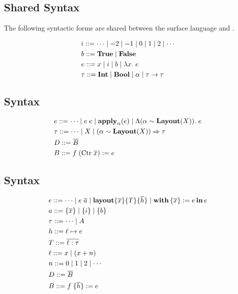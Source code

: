 \subsection{Shared Syntax}

The following syntactic forms are shared between the \Pika{} surface language and \PikaCore.

\begin{align*}
  &i ::= \cdots \mid -2 \mid -1 \mid 0 \mid 1 \mid 2 \mid \cdots
  \\
  &b ::= \textbf{True}{} \mid \textbf{False}
  \\
  &e ::= x \mid i \mid b \mid \lambda x.\; e
  \\
  &\tau ::= \textbf{Int} \mid \textbf{Bool} \mid \alpha \mid \tau \rightarrow \tau
\end{align*}

\subsection{\Pika{} Syntax}
\begin{align*}
  &e ::= \cdots \mid e\; e \mid \textbf{apply}_{\alpha}(e) \mid \Lambda (\alpha \sim \textbf{Layout}(X)).\; e
  \\
  &\tau ::= \cdots \mid X \mid (\alpha \sim \textbf{Layout}(X)) \Rightarrow \tau
  \\
  &D ::= \overline{B}
  \\
  &B ::= f\; (\textrm{Ctr}\; \overline{x}) := e
\end{align*}

\subsection{\PikaCore{} Syntax}
\begin{align*}
  &e ::= \cdots \mid e\; \overline{a} \mid \textbf{layout}\{ \overline{x} \}\{ T \}\{ \overline{h} \} \mid \textbf{with}\,\{ \overline{x} \} := e\,\textbf{in}\, e
  \\
  &a ::= \{ \overline{x} \} \mid \{ i \} \mid \{ b \}
  \\
  &\tau ::= \cdots \mid A
  \\
  &h ::= \ell \mapsto e
  \\
  &T ::= \overline{\ell : \tau}
  \\
  &\ell ::= x \mid (x + n)
  \\
  &n ::= 0 \mid 1 \mid 2 \mid \cdots
  \\
  &D ::= \overline{B}
  \\
  &B ::= f\; \{ \overline{h} \} := e
\end{align*}

